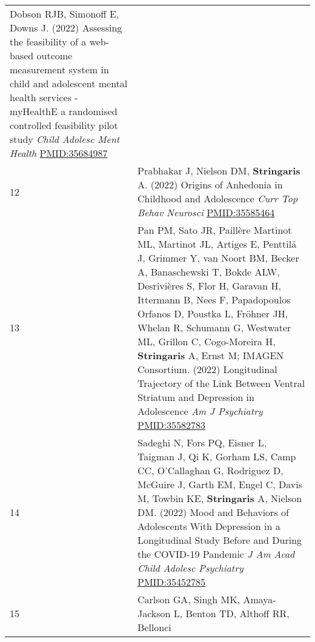 \documentclass[
]{article}
\begin{document}
\begin{longtable}[]{@{}ll@{}}
\begin{minipage}[t]{0.94\columnwidth}
Dobson RJB, Simonoff E, Downs J. (2022) Assessing the feasibility of a
web-based outcome measurement system in child and adolescent mental
health services - myHealthE a randomised controlled feasibility pilot
study \emph{Child Adolesc Ment Health} \url{PMID:35684987}\strut
\end{minipage}\tabularnewline
\begin{minipage}[t]{0.01\columnwidth}\raggedright
12\strut
\end{minipage} & \begin{minipage}[t]{0.94\columnwidth}\raggedright
Prabhakar J, Nielson DM, \textbf{Stringaris} A. (2022) Origins of
Anhedonia in Childhood and Adolescence \emph{Curr Top Behav Neurosci}
\url{PMID:35585464}\strut
\end{minipage}\tabularnewline
\begin{minipage}[t]{0.01\columnwidth}\raggedright
13\strut
\end{minipage} & \begin{minipage}[t]{0.94\columnwidth}\raggedright
Pan PM, Sato JR, Paillère Martinot ML, Martinot JL, Artiges E, Penttilä
J, Grimmer Y, van Noort BM, Becker A, Banaschewski T, Bokde ALW,
Desrivières S, Flor H, Garavan H, Ittermann B, Nees F, Papadopoulos
Orfanos D, Poustka L, Fröhner JH, Whelan R, Schumann G, Westwater ML,
Grillon C, Cogo-Moreira H, \textbf{Stringaris} A, Ernst M; IMAGEN
Consortium. (2022) Longitudinal Trajectory of the Link Between Ventral
Striatum and Depression in Adolescence \emph{Am J Psychiatry}
\url{PMID:35582783}\strut
\end{minipage}\tabularnewline
\begin{minipage}[t]{0.01\columnwidth}\raggedright
14\strut
\end{minipage} & \begin{minipage}[t]{0.94\columnwidth}\raggedright
Sadeghi N, Fors PQ, Eisner L, Taigman J, Qi K, Gorham LS, Camp CC,
O'Callaghan G, Rodriguez D, McGuire J, Garth EM, Engel C, Davis M,
Towbin KE, \textbf{Stringaris} A, Nielson DM. (2022) Mood and Behaviors
of Adolescents With Depression in a Longitudinal Study Before and During
the COVID-19 Pandemic \emph{J Am Acad Child Adolesc Psychiatry}
\url{PMID:35452785}\strut
\end{minipage}\tabularnewline
\begin{minipage}[t]{0.01\columnwidth}\raggedright
15\strut
\end{minipage} & \begin{minipage}[t]{0.94\columnwidth}\raggedright
Carlson GA, Singh MK, Amaya-Jackson L, Benton TD, Althoff RR, Bellonci

\end{minipage}
\end{longtable}
\end{document}

